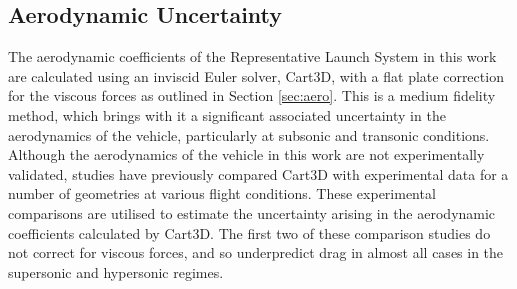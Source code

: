 \subsection{Aerodynamic Uncertainty}\label{sec:aerouncsub}



The aerodynamic coefficients of the Representative Launch System in this work are calculated using an inviscid Euler solver, Cart3D, with a flat plate correction for the viscous forces as outlined in Section \ref{sec:aero}. This is a medium fidelity method, which brings with it a significant associated uncertainty in the aerodynamics of the vehicle, particularly at subsonic and transonic conditions. Although the aerodynamics of the vehicle in this work are not experimentally validated, studies have previously compared Cart3D with experimental data for a number of geometries at various flight conditions. These experimental comparisons are utilised to estimate the uncertainty arising in the aerodynamic coefficients calculated by Cart3D. The first two of these comparison studies do not correct for viscous forces, and so underpredict drag in almost all cases in the supersonic and hypersonic regimes.




